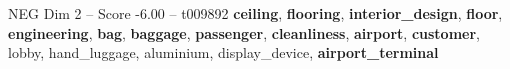 \begin{textsample}{NEG Dim 2 – Score -6.00 – t009892}  \label{ex:f2_neg_004}
\textbf{ceiling}, \textbf{flooring}, \textbf{interior\_design}, \textbf{floor}, \textbf{engineering}, \textbf{bag}, \textbf{baggage}, \textbf{passenger}, \textbf{cleanliness}, \textbf{airport}, \textbf{customer}, lobby, hand\_luggage, aluminium, display\_device, \textbf{airport\_terminal}

\end{textsample}
